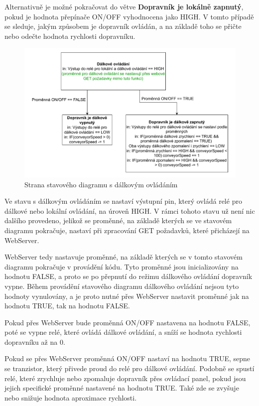 Alternativně je možné pokračovat do větve \textbf{Dopravník je lokálně zapnutý}, pokud je hodnota přepínače ON/OFF vyhodnocena jako HIGH. V tomto případě se sleduje, jakým způsobem je dopravník ovládán, a na základě toho se přičte nebo odečte hodnota rychlosti dopravníku.

\begin{figure}[H]
	\centering
	\includegraphics[width=1\linewidth]{images/StateFlow_Firmwaru_right.drawio.pdf}
	\caption{Strana stavového diagramu s dálkovým ovládáním}
	\label{fig:StateFlow_Firmwaru_right}
\end{figure}

Ve stavu s dálkovým ovládáním se nastaví výstupní pin, který ovládá relé pro dálkové nebo lokální ovládání, na úroveň HIGH. V rámci tohoto stavu už není nic dalšího provedeno, jelikož se proměnné, na základě kterých se ve stavovém diagramu pokračuje, nastaví při zpracování GET požadavků, které přicházejí na WebServer.

WebServer tedy nastavuje proměnné, na základě kterých se v tomto stavovém diagramu pokračuje v provádění kódu. Tyto proměnné jsou inicializovány na hodnotu FALSE, a proto se po přepnutí do režimu dálkového ovládání dopravník vypne. Během provádění stavového diagramu dálkového ovládání nejsou tyto hodnoty vynulovány, a je proto nutné přes WebServer nastavit proměnné jak na hodnotu TRUE, tak na hodnotu FALSE.

Pokud přes WebServer bude proměnná ON/OFF nastavena na hodnotu FALSE, poté se vypne relé, které ovládá dálkové ovládání, a sníží se hodnota rychlosti dopravníku až na 0.

Pokud se přes WebServer proměnná ON/OFF nastaví na hodnotu TRUE, sepne se tranzistor, který přivede proud do relé pro dálkové ovládání. Podobně se spustí relé, které zrychluje nebo zpomaluje dopravník přes ovládací panel, pokud jsou jejich specifické proměnné nastavené na hodnotu TRUE. Také zde se zvyšuje nebo snižuje hodnota aproximace rychlosti.

